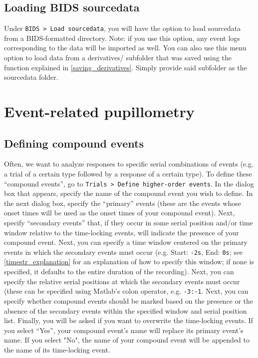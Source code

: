 \documentclass{article}
\begin{document}
\subsection{Loading BIDS sourcedata} \label{load_sourcedata}
Under \texttt{BIDS > Load sourcedata}, you will have the option to load sourcedata from a BIDS-formatted directory. Note: if you use this option, any event logs corresponding to the data will be imported as well. You can also use this menu option to load data from a derivatives/ subfolder that was saved using the function explained in \ref{saving_derivatives}. Simply provide said subfolder as the sourcedata folder.
\section{Event-related pupillometry}
\subsection{Defining compound events}
Often, we want to analyze responses to specific serial combinations of events (e.g. a trial of a certain type followed by a response of a certain type). To define these ``compound events'', go to \texttt{Trials > Define higher-order events}. In the dialog box that appears, specify the name of the compound event you wish to define. In the next dialog box, specify the ``primary'' events (these are the events whose onset times will be used as the onset times of your compound event). Next, specify ``secondary events'' that, if they occur in some serial position and/or time window relative to the time-locking events, will indicate the presence of your compound event. Next, you can specify a time window centered on the primary events in which the secondary events must occur (e.g. Start: \texttt{-2s}, End: \texttt{0s}; see \ref{timestr_explanation} for an explanation of how to specify this window; if none is specified, it defaults to the entire duration of the recording).  Next, you can specify the relative serial positions at which the secondary events must occur (these can be specified using Matlab's colon operator, e.g. \texttt{-3:-1}. Next, you can specify whether compound events should be marked based on the presence or the absence of the secondary events within the specified window and serial position list. Finally, you will be asked if you want to overwrite the time-locking events. If you select ``Yes'', your compound event's name will replace its primary event's name. If you select "No", the name of your compound event will be appended to the name of its time-locking event.
\end{document}
